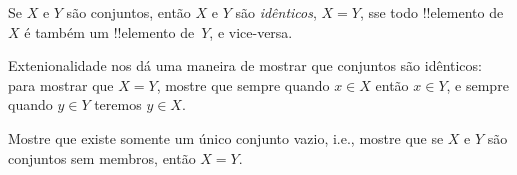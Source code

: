 \documentclass[../../../include/open-logic-section]{subfiles}
\begin{document}


\begin{defn}[Extensionalidade]
  Se $X$ e $Y$ são conjuntos, então $X$ e $Y$ são \emph{idênticos}, $X =
  Y$, sse todo !!{elemento} de~$X$ é também um !!{elemento} de~$Y$, e
  vice-versa. %
\end{defn}


\begin{explain}
Extenionalidade nos dá uma maneira de mostrar que conjuntos são idênticos:
para mostrar que $X = Y$, mostre que sempre quando $x \in X$ então $x \in Y$,
e sempre quando $y \in Y$ teremos $y \in X$.
\end{explain}


\begin{prob}
Mostre que existe somente um único conjunto vazio, i.e., mostre que se $X$
e $Y$ são conjuntos sem membros, então $X = Y$.
\end{prob}

\end{document}
